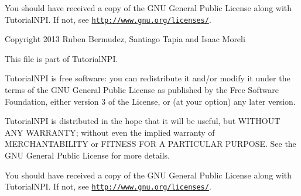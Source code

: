 You should have received a copy of the G\-N\-U General Public License along with Tutorial\-N\-P\-I. If not, see \href{http://www.gnu.org/licenses/}{\tt http\-://www.\-gnu.\-org/licenses/}.

Copyright 2013 Ruben Bermudez, Santiago Tapia and Isaac Moreli

This file is part of Tutorial\-N\-P\-I.

Tutorial\-N\-P\-I is free software\-: you can redistribute it and/or modify it under the terms of the G\-N\-U General Public License as published by the Free Software Foundation, either version 3 of the License, or (at your option) any later version.

Tutorial\-N\-P\-I is distributed in the hope that it will be useful, but W\-I\-T\-H\-O\-U\-T A\-N\-Y W\-A\-R\-R\-A\-N\-T\-Y; without even the implied warranty of M\-E\-R\-C\-H\-A\-N\-T\-A\-B\-I\-L\-I\-T\-Y or F\-I\-T\-N\-E\-S\-S F\-O\-R A P\-A\-R\-T\-I\-C\-U\-L\-A\-R P\-U\-R\-P\-O\-S\-E. See the G\-N\-U General Public License for more details.

You should have received a copy of the G\-N\-U General Public License along with Tutorial\-N\-P\-I. If not, see \href{http://www.gnu.org/licenses/}{\tt http\-://www.\-gnu.\-org/licenses/}. 